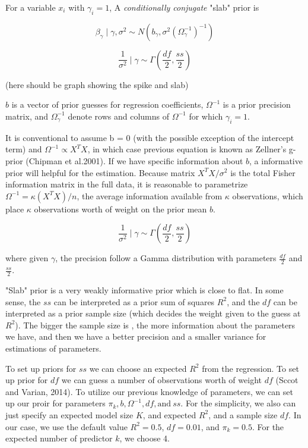 For a variable $x_i$ with $\gamma_i = 1$, A \textit{conditionally conjugate} "slab" prior is 


$$ \beta_{\gamma} \mid \gamma, \sigma^{2} \sim N(b_{\gamma}, \sigma^{2}(\Omega_{\gamma}^{-1})^{-1})$$

$$\frac {1}{\sigma^{2}} \mid \gamma \sim  \Gamma(\frac{df}{2}, \frac{ss}{2})$$


(here should be graph showing the spike and slab)


$b$ is a vector of prior guesses for regression coefficients,  $\Omega^{-1}$ is a prior precision matrix, and  $\Omega_{\gamma}^{-1}$  denote rows and columns of  $\Omega^{-1}$ for which $\gamma_i = 1$.


It is conventional to assume b = 0 (with the possible exception of the intercept term) and $\Omega^{-1} \propto X^T X$, in which case previous equation  is known as Zellner's g-prior (Chipman et al.2001).  If we have specific information about $b$, a informative prior will helpful for the estimation. Because matrix $X^T X/\sigma^{2}$ is the total Fisher information matrix in the full data, it is reasonable to parametrize $\Omega^{-1} = \kappa (X^T X)/n$, the average information available from $\kappa$ observations, which place $\kappa$ observations worth of weight on the prior mean $b$.




$$\frac {1}{\sigma^{2}} \mid \gamma \sim  \Gamma(\frac{df}{2}, \frac{ss}{2})$$







where given $\gamma$,  the precision follow a Gamma distribution with parameters $\frac{df}{2}$ and $\frac{ss}{2}$. 







"Slab" prior is a very weakly informative prior which is close to flat. In some sense, the $ss$ can be interpreted as a prior sum of squares $R^2$, and the $df$ can be interpreted as a prior sample size (which decides the weight given to the guess at $R^2$). The bigger the sample size is , the more information about the parameters we have, and then  we have a better precision and a smaller variance for estimations of parameters. 







To set up priors for $ss$ we can choose an expected $R^2$  from the regression. To set up prior for $df$ we can guess a number of observations worth of weight $df$ (Sccot and Varian, 2014). To utilize our previous knowledge of parameters, we can set up our proir for parameters $\pi_k, b, \Omega^{-1}, df, \text {and} \  ss$. For the simplicity, we also can just specify an expected model size $K$, and expected $R^2$, and a sample size $df$. In our case, we use the default value $R^2 = 0.5$, $df = 0.01$, and $\pi_k = 0.5$. For the expected number of predictor $k$, we choose 4. 


